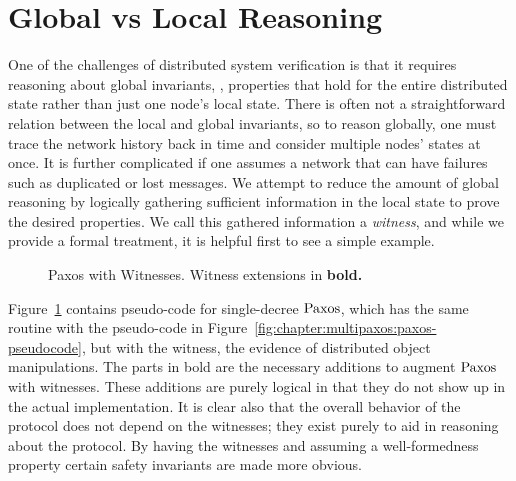 \section{Global vs Local Reasoning}
\label{chapter:witnesspassing:sec:global-local-reasoning}

One of the challenges of distributed system verification is that it requires reasoning about
global invariants, \ie, properties that hold for the entire distributed state rather than just
one node's local state.
There is often not a straightforward relation between the local and global invariants, so
to reason globally, one must trace the network history back in time and consider multiple
nodes' states at once.
It is further complicated if one assumes a network that can have failures such as duplicated
or lost messages.
We attempt to reduce the amount of global reasoning by logically gathering sufficient
information in the local state to prove the desired properties.
We call this gathered information a \textit{witness}, and while we provide a formal treatment, it is helpful first to see a simple example.

\begin{figure}
\begin{minipage}{\linewidth}
\noindent
\begin{multicols}{2}
  
\end{multicols}
\end{minipage}
\caption{Paxos with Witnesses. Witness extensions in \bfseries{bold}.}
\label{fig:chapter:witnesspassing:paxos-witness}
\end{figure}

Figure~\ref{fig:chapter:witnesspassing:paxos-witness} contains pseudo-code for single-decree $\mathrm{Paxos}$,
which has the same routine with the pseudo-code in Figure~\ref{fig:chapter:multipaxos:paxos-pseudocode},
but with the witness, the evidence of distributed object manipulations.
The parts in bold are the necessary additions to augment $\mathrm{Paxos}$ with witnesses.
These additions are purely logical in that they do not show up in the actual implementation.
It is clear also that the overall behavior of the protocol does not depend on the witnesses;
they exist purely to aid in reasoning about the protocol.
By having the witnesses and assuming a well-formedness property certain safety invariants are
made more obvious.

